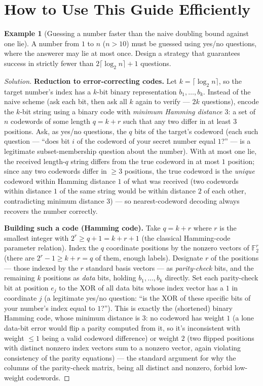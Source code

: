 \documentclass[11pt]{article}
\theoremstyle{definition}
\newtheorem{example}{Example}[section]
\begin{document}
\section*{How to Use This Guide Efficiently}
\begin{example}[Guessing a number faster than the naive doubling bound against one lie]
A number from $1$ to $n$ ($n>10$) must be guessed using yes/no questions, where the answerer may lie at most once. Design a strategy that guarantees success in strictly fewer than $2\lceil\log_2n\rceil+1$ questions.
\end{example}
\begin{proof}[Solution]
\textbf{Reduction to error-correcting codes.} Let $k=\lceil\log_2n\rceil$, so the target number's index has a $k$-bit binary representation $b_1,\dots,b_k$. Instead of the naive scheme (ask each bit, then ask all $k$ again to verify — $2k$ questions), encode the $k$-bit string using a binary code with \emph{minimum Hamming distance $3$}: a set of $n$ codewords of some length $q=k+r$ such that any two differ in at least $3$ positions. Ask, as yes/no questions, the $q$ bits of the target's codeword (each such question — ``does bit $i$ of the codeword of your secret number equal $1$?'' — is a legitimate subset-membership question about the number). With at most one lie, the received length-$q$ string differs from the true codeword in at most $1$ position; since any two codewords differ in $\ge3$ positions, the true codeword is the \emph{unique} codeword within Hamming distance $1$ of what was received (two codewords within distance $1$ of the same string would be within distance $2$ of each other, contradicting minimum distance $3$) — so nearest-codeword decoding always recovers the number correctly.

\textbf{Building such a code (Hamming code).} Take $q=k+r$ where $r$ is the smallest integer with $2^r\ge q+1=k+r+1$ (the classical Hamming-code parameter relation). Index the $q$ coordinate positions by the nonzero vectors of $\mathbb F_2^r$ (there are $2^r-1\ge k+r=q$ of them, enough labels). Designate $r$ of the positions — those indexed by the $r$ standard basis vectors — as \emph{parity-check} bits, and the remaining $k$ positions as \emph{data} bits, holding $b_1,\dots,b_k$ directly. Set each parity-check bit at position $e_j$ to the XOR of all data bits whose index vector has a $1$ in coordinate $j$ (a legitimate yes/no question: ``is the XOR of these specific bits of your number's index equal to $1$?''). This is exactly the (shortened) binary Hamming code, whose minimum distance is $3$: no codeword has weight $1$ (a lone data-bit error would flip a parity computed from it, so it's inconsistent with weight $\le1$ being a valid codeword difference) or weight $2$ (two flipped positions with distinct nonzero index vectors sum to a nonzero vector, again violating consistency of the parity equations) — the standard argument for why the columns of the parity-check matrix, being all distinct and nonzero, forbid low-weight codewords.


\end{proof}
\end{document}
